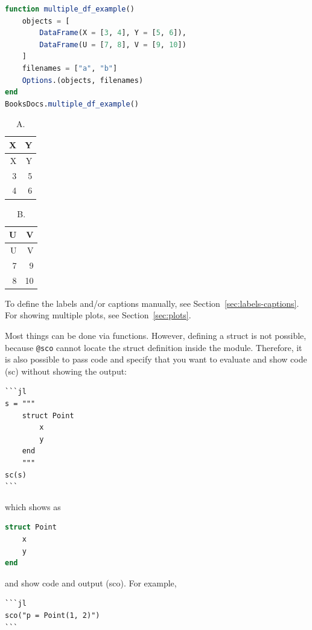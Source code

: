 \documentclass[
  notoc %
]{tufte-book}
\newcommand{\passthrough}[1]{#1}
\begin{document}
\begin{lstlisting}[language=Julia]
function multiple_df_example()
    objects = [
        DataFrame(X = [3, 4], Y = [5, 6]),
        DataFrame(U = [7, 8], V = [9, 10])
    ]
    filenames = ["a", "b"]
    Options.(objects, filenames)
end
BooksDocs.multiple_df_example()
\end{lstlisting}

\hypertarget{tbl:a}{}
\begin{longtable}[]{@{}rr@{}}
\caption{\label{tbl:a}A.}\tabularnewline
\toprule()
X & Y \\
\midrule()
\endfirsthead
\toprule()
X & Y \\
\midrule()
\endhead
3 & 5 \\
4 & 6 \\
\bottomrule()
\end{longtable}

\hypertarget{tbl:b}{}
\begin{longtable}[]{@{}rr@{}}
\caption{\label{tbl:b}B.}\tabularnewline
\toprule()
U & V \\
\midrule()
\endfirsthead
\toprule()
U & V \\
\midrule()
\endhead
7 & 9 \\
8 & 10 \\
\bottomrule()
\end{longtable}

To define the labels and/or captions manually, see
Section~\ref{sec:labels-captions}. For showing multiple plots, see
Section~\ref{sec:plots}.

Most things can be done via functions. However, defining a struct is not
possible, because \passthrough{\lstinline!@sco!} cannot locate the
struct definition inside the module. Therefore, it is also possible to
pass code and specify that you want to evaluate and show code (sc)
without showing the output:

\begin{lstlisting}
```jl
s = """
    struct Point
        x
        y
    end
    """
sc(s)
```
\end{lstlisting}

which shows as

\begin{lstlisting}[language=Julia]
struct Point
    x
    y
end
\end{lstlisting}

and show code and output (sco). For example,

\begin{lstlisting}
```jl
sco("p = Point(1, 2)")
```
\end{lstlisting}
\end{document}
